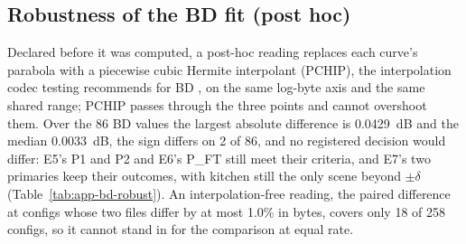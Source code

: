 \subsection{Robustness of the BD fit (post hoc)}
\label{sec:bd-robust}

Declared before it was computed, a post-hoc reading replaces each curve's parabola with a piecewise cubic Hermite interpolant (PCHIP), the interpolation codec testing recommends for BD \citep[Sec.~VI-C]{barman2024bjontegaard}, on the same log-byte axis and the same shared range; PCHIP passes through the three points and cannot overshoot them. %
Over the 86 BD values the largest absolute difference is 0.0429~dB and the median 0.0033~dB, the sign differs on 2 of 86, and no registered decision would differ: E5's P1 and P2 and E6's P\_FT still meet their criteria, and E7's two primaries keep their outcomes, with kitchen still the only scene beyond $\pm\delta$ (Table~\ref{tab:app-bd-robust}). %
An interpolation-free reading, the paired difference at configs whose two files differ by at most 1.0\% in bytes, covers only 18 of 258 configs, so it cannot stand in for the comparison at equal rate. %
